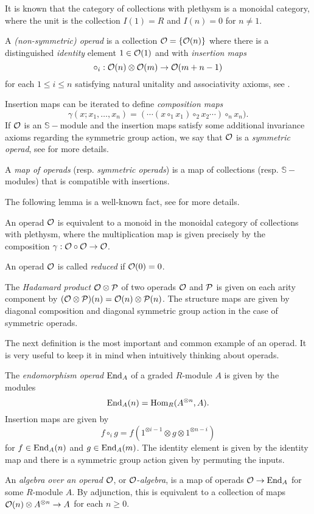 \documentclass[Thesis.tex]{subfiles}
\begin{document}
It is known that the category of collections with plethysm is a monoidal category, where the unit is the collection $I(1)=R$ and $I(n)=0$ for $n\neq 1$. 
\begin{defin}
A \emph{(non-symmetric) operad} is a collection ${\mathcal O}=\{{\mathcal O}(n)\}$ where there is a distinguished \emph{identity} element $1\in{\mathcal O}(1)$ and with \emph{insertion maps} 
\[\circ_i:{\mathcal O}(n)\otimes {\mathcal O}(m)\to {\mathcal O}(m+n-1)\]
for each $1\leq i\leq n$ satisfying natural unitality and associativity axioms, see \cite[\S 1.1.2]{ward}. 

Insertion maps can be iterated to define \emph{composition maps} \[\gamma(x;x_1,\dots, x_n)=(\cdots(x\circ_1 x_1)\circ_2 x_2\cdots
)\circ_n x_n).\]
If ${\mathcal O}$ is an $\mathbb{S}-$module and the insertion maps satisfy some additional invariance axioms regarding the symmetric group action, we say that ${\mathcal O}$ is a \emph{symmetric operad}, see \cite{lodayvallette} for more details.

A \emph{map of operads} (resp. \emph{symmetric operads}) is a map of collections (resp. $\mathbb{S}-$modules) that is compatible with insertions.
\end{defin}

The following lemma is a well-known fact, see \cite[\S 5]{lodayvallette} for more details. 
\begin{lem}\label{monoid}
An operad ${\mathcal O}$ is equivalent to a monoid in the monoidal category of collections with plethysm, where the multiplication  map is given precisely by the composition $\gamma:{\mathcal O}\circ{\mathcal O}\to{\mathcal O}$. 
\end{lem}


\begin{defin} An operad ${\mathcal O}$ is called \emph{reduced} if ${\mathcal O}(0)=0$.\end{defin}

\begin{defin}The \emph{Hadamard product} ${\mathcal O}\otimes\mathcal{P}$ of  two operads ${\mathcal O}$ and $\mathcal{P}$ is given on each arity component by $({\mathcal O}\otimes\mathcal{P})(n)={\mathcal O}(n)\otimes\mathcal{P}(n)$. The structure maps are given by diagonal composition and diagonal symmetric group action in the case of symmetric operads. \end{defin}

The next definition is the most important and common example of an operad. It is very useful to keep it in mind when intuitively thinking about operads.

\begin{defin}
The \emph{endomorphism operad} $\operatorname{End}_A$ of a graded $R$-module $A$ is given by the modules \[\operatorname{End}_A(n)=\operatorname{Hom}_R(A^{\otimes n},A).\] Insertion maps are given by
\[f\circ_i g=f(1^{\otimes i-1}\otimes g\otimes 1^{\otimes n-i})\]
for $f\in\operatorname{End}_A(n)$ and $g\in\operatorname{End}_A(m)$. The identity element is given by the identity map and there is a symmetric group action given by permuting the inputs.
\end{defin}
\begin{defin}
An \emph{algebra over an operad} ${\mathcal O}$, or ${\mathcal O}$-\emph{algebra}, is a map of operads ${\mathcal O}\to\operatorname{End}_A$ for some $R$-module $A$. By adjunction, this is equivalent to a collection of maps ${\mathcal O}(n)\otimes A^{\otimes n}\to A$ for each $n\geq 0$.  
\end{defin}
\end{document}
